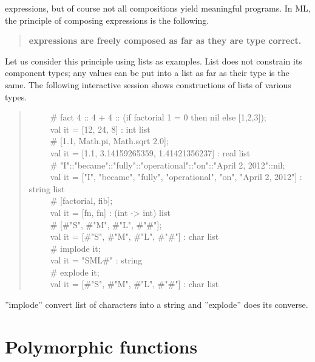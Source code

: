 \documentclass{jbook}
\newcommand{\txt}[2]{#2}
\newcommand{\myem}{\ \ \ \ \  }
\begin{document}
expressions, but of course not all compositions yield meaningful
programs.
	In ML, the principle of composing expressions is the following.
\begin{quote}
{\bf expressions are freely composed as far as they are type correct.}
\end{quote}
	Let us consider this principle using lists as examples.
	List does not constrain its component types; any values can be
put into a list as far as their type is the same.
	The following interactive session shows constructions of lists
of various types.
\begin{tt}
\begin{quote}
\myem \# fact 4 :: 4 + 4 :: (if factorial 1 = 0 then nil else [1,2,3]);
\\\myem  val it = [12, 24, 8] : int list
\\\myem   \# [1.1, Math.pi, Math.sqrt 2.0];
\\\myem   val it = [1.1, 3.14159265359, 1.41421356237] : real list
\\\myem   \# "I"::"became"::"fully"::"operational"::"on"::"April 2, 2012"::nil;
\\\myem   val it = ["I", "became", "fully", "operational", "on", "April 2, 2012"] : string list
\\\myem   \# [factorial, fib];
\\\myem   val it = [fn, fn] : (int  -> int) list
\\\myem   \# [\#"S", \#"M", \#"L", \#"\#"];
\\\myem   val it = [\#"S", \#"M", \#"L", \#"\#"] : char list
\\\myem   \# implode it;
\\\myem   val it = "SML\#" : string
\\\myem   \# explode it;
\\\myem   val it = [\#"S", \#"M", \#"L", \#"\#"] : char list
\end{quote}
\end{tt}
''implode'' convert list of characters into a string and ''explode''
does its converse.
\fi%

\section{\txt{多相型を持つ関数}{Polymorphic functions}}
\label{sec:tutorialPolymorphicfunction}
\end{document}
